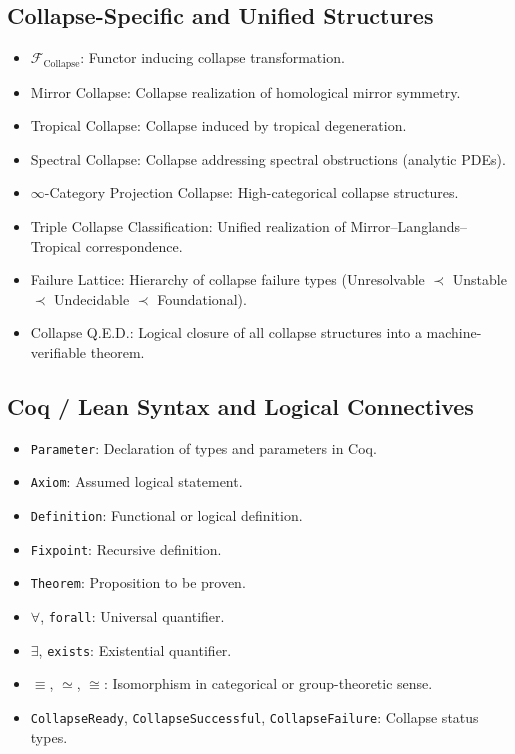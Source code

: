 \documentclass[11pt]{article}
\begin{document}
\subsection*{Collapse-Specific and Unified Structures}

\begin{itemize}
  \item $\mathcal{F}_{\mathrm{Collapse}}$: Functor inducing collapse transformation.
  \item Mirror Collapse: Collapse realization of homological mirror symmetry.
  \item Tropical Collapse: Collapse induced by tropical degeneration.
  \item Spectral Collapse: Collapse addressing spectral obstructions (analytic PDEs).
  \item $\infty$-Category Projection Collapse: High-categorical collapse structures.
  \item Triple Collapse Classification: Unified realization of Mirror–Langlands–Tropical correspondence.
  \item Failure Lattice: Hierarchy of collapse failure types (Unresolvable $\prec$ Unstable $\prec$ Undecidable $\prec$ Foundational).
  \item Collapse Q.E.D.: Logical closure of all collapse structures into a machine-verifiable theorem.
\end{itemize}

\subsection*{Coq / Lean Syntax and Logical Connectives}

\begin{itemize}
  \item \texttt{Parameter}: Declaration of types and parameters in Coq.
  \item \texttt{Axiom}: Assumed logical statement.
  \item \texttt{Definition}: Functional or logical definition.
  \item \texttt{Fixpoint}: Recursive definition.
  \item \texttt{Theorem}: Proposition to be proven.
  \item $\forall$, \texttt{forall}: Universal quantifier.
  \item $\exists$, \texttt{exists}: Existential quantifier.
  \item $\equiv$, $\simeq$, $\cong$: Isomorphism in categorical or group-theoretic sense.
  \item \texttt{CollapseReady}, \texttt{CollapseSuccessful}, \texttt{CollapseFailure}: Collapse status types.
\end{itemize}
\end{document}
